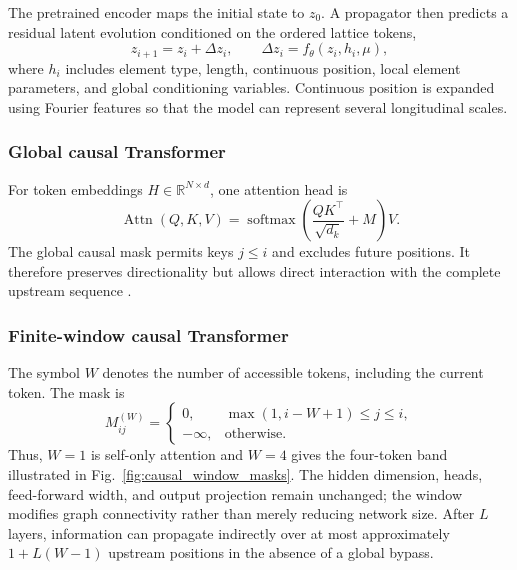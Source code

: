 The pretrained encoder maps the initial state to $z_0$. A propagator then predicts a residual latent evolution conditioned on the ordered lattice tokens,
\begin{equation}
    z_{i+1}
    =
    z_i+\Delta z_i,
    \qquad
    \Delta z_i=f_{\theta}(z_i,h_i,\mu),
    \label{eq:latent_propagator_revised}
\end{equation}
where $h_i$ includes element type, length, continuous position, local element parameters, and global conditioning variables. Continuous position is expanded using Fourier features so that the model can represent several longitudinal scales.

\subsubsection{Global causal Transformer}

For token embeddings $H\in\mathbb{R}^{N\times d}$, one attention head is
\begin{equation}
    \operatorname{Attn}(Q,K,V)
    =
    \operatorname{softmax}
    \left(
        \frac{QK^{\top}}{\sqrt{d_k}}
        +M
    \right)V.
    \label{eq:attention_revised}
\end{equation}
The global causal mask permits keys $j\leq i$ and excludes future positions. It therefore preserves directionality but allows direct interaction with the complete upstream sequence \cite{vaswani_attention_2017}.

\subsubsection{Finite-window causal Transformer}

The symbol $W$ denotes the number of accessible tokens, including the current token. The mask is
\begin{equation}
    M_{ij}^{(W)}
    =
    \begin{cases}
        0,
        & \max(1,i-W+1)\leq j\leq i,\\
        -\infty,
        & \text{otherwise}.
    \end{cases}
    \label{eq:window_mask_revised}
\end{equation}
Thus, $W=1$ is self-only attention and $W=4$ gives the four-token band illustrated in Fig.~\ref{fig:causal_window_masks}. The hidden dimension, heads, feed-forward width, and output projection remain unchanged; the window modifies graph connectivity rather than merely reducing network size. After $L$ layers, information can propagate indirectly over at most approximately $1+L(W-1)$ upstream positions in the absence of a global bypass.

